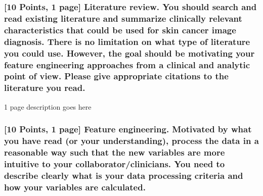 \documentclass[]{article}
\begin{document}
\hypertarget{points-1-page-literature-review.-you-should-search-and-read-existing-literature-and-summarize-clinically-relevant-characteristics-that-could-be-used-for-skin-cancer-image-diagnosis.-there-is-no-limitation-on-what-type-of-literature-you-could-use.-however-the-goal-should-be-motivating-your-feature-engineering-approaches-from-a-clinical-and-analytic-point-of-view.-please-give-appropriate-citations-to-the-literature-you-read.}{%
\subsubsection{{[}10 Points, 1 page{]} Literature review. You should
search and read existing literature and summarize clinically relevant
characteristics that could be used for skin cancer image diagnosis.
There is no limitation on what type of literature you could use.
However, the goal should be motivating your feature engineering
approaches from a clinical and analytic point of view. Please give
appropriate citations to the literature you
read.}\label{points-1-page-literature-review.-you-should-search-and-read-existing-literature-and-summarize-clinically-relevant-characteristics-that-could-be-used-for-skin-cancer-image-diagnosis.-there-is-no-limitation-on-what-type-of-literature-you-could-use.-however-the-goal-should-be-motivating-your-feature-engineering-approaches-from-a-clinical-and-analytic-point-of-view.-please-give-appropriate-citations-to-the-literature-you-read.}}

1 page description goes here

\hypertarget{points-1-page-feature-engineering.-motivated-by-what-you-have-read-or-your-understanding-process-the-data-in-a-reasonable-way-such-that-the-new-variables-are-more-intuitive-to-your-collaboratorclinicians.-you-need-to-describe-clearly-what-is-your-data-processing-criteria-and-how-your-variables-are-calculated.}{%
\subsubsection{{[}10 Points, 1 page{]} Feature engineering. Motivated by
what you have read (or your understanding), process the data in a
reasonable way such that the new variables are more intuitive to your
collaborator/clinicians. You need to describe clearly what is your data
processing criteria and how your variables are
calculated.}\label{points-1-page-feature-engineering.-motivated-by-what-you-have-read-or-your-understanding-process-the-data-in-a-reasonable-way-such-that-the-new-variables-are-more-intuitive-to-your-collaboratorclinicians.-you-need-to-describe-clearly-what-is-your-data-processing-criteria-and-how-your-variables-are-calculated.}}
\end{document}
